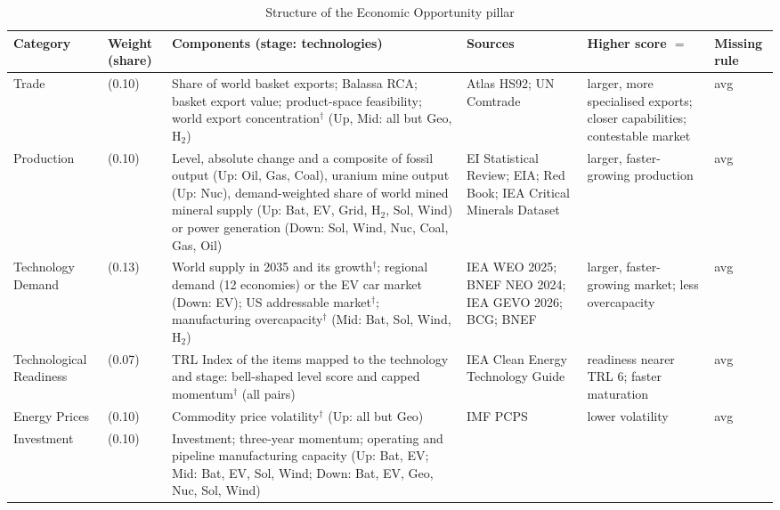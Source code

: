 \begin{table}[tp]
\centering
\begin{threeparttable}
\caption{Structure of the Economic Opportunity pillar}
\label{tab:eo_structure}
\scriptsize
\setlength{\tabcolsep}{3pt}
\begin{tabularx}{\textwidth}{@{}>{\raggedright\arraybackslash}p{1.8cm}
  >{\centering\arraybackslash}p{0.9cm}
  >{\raggedright\arraybackslash}X
  >{\raggedright\arraybackslash}p{2.4cm}
  >{\raggedright\arraybackslash}p{2.3cm}
  >{\raggedright\arraybackslash}p{1.2cm}@{}}
\toprule
Category & Weight (share) & Components (stage: technologies) & Sources & Higher score $=$ & Missing rule\\
\midrule
Trade & 3 (0.10) &
Share of world basket exports; Balassa RCA; basket export value; product-space feasibility;
world export concentration$^{\dagger}$ (Up, Mid: all but Geo, H$_2$) &
Atlas HS92; UN Comtrade &
larger, more specialised exports; closer capabilities; contestable market & avg\\
\addlinespace
Production & 3 (0.10) &
Level, absolute change and a composite of fossil output (Up: Oil, Gas, Coal), uranium mine output
(Up: Nuc), demand-weighted share of world mined mineral supply (Up: Bat, EV, Grid, H$_2$, Sol,
Wind) or power generation (Down: Sol, Wind, Nuc, Coal, Gas, Oil) &
EI Statistical Review; EIA; Red Book; IEA Critical Minerals Dataset &
larger, faster-growing production & avg\\
\addlinespace
Technology Demand & 4 (0.13) &
World supply in 2035 and its growth$^{\dagger}$; regional demand (12 economies) or the EV car
market (Down: EV); US addressable market$^{\dagger}$; manufacturing overcapacity$^{\dagger}$ (Mid:
Bat, Sol, Wind, H$_2$) &
IEA WEO 2025; BNEF NEO 2024; IEA GEVO 2026; BCG; BNEF &
larger, faster-growing market; less overcapacity & avg\\
\addlinespace
Technological Readiness & 2 (0.07) &
TRL Index of the items mapped to the technology and stage: bell-shaped level score and capped
momentum$^{\dagger}$ (all pairs) &
IEA Clean Energy Technology Guide &
readiness nearer TRL 6; faster maturation & avg\\
\addlinespace
Energy Prices & 3 (0.10) &
Commodity price volatility$^{\dagger}$ (Up: all but Geo) & IMF PCPS & lower volatility & avg\\
\addlinespace
Investment & 3 (0.10) &
Investment; three-year momentum; operating and pipeline manufacturing capacity (Up: Bat, EV; Mid:
Bat, EV, Sol, Wind; Down: Bat, EV, Geo, Nuc, Sol, Wind) &

\end{tabularx}
\end{threeparttable}
\end{table}
